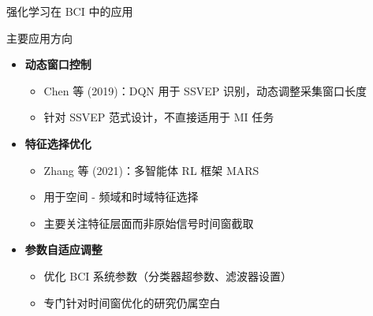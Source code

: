 \begin{frame}{强化学习在 BCI 中的应用}
    \begin{block}{\normalsize 主要应用方向}
        \begin{itemize}
            \item[\textcolor{primaryblue}{\textbullet}] \textbf{动态窗口控制}
            \begin{itemize}
                \item Chen 等 (2019)：DQN 用于 SSVEP 识别，动态调整采集窗口长度
                \item 针对 SSVEP 范式设计，不直接适用于 MI 任务
            \end{itemize}

            \vspace{0.5em}
            \item[\textcolor{primaryblue}{\textbullet}] \textbf{特征选择优化}
            \begin{itemize}
                \item Zhang 等 (2021)：多智能体 RL 框架 MARS
                \item 用于空间 - 频域和时域特征选择
                \item 主要关注特征层面而非原始信号时间窗截取
            \end{itemize}

            \vspace{0.5em}
            \item[\textcolor{primaryblue}{\textbullet}] \textbf{参数自适应调整}
            \begin{itemize}
                \item 优化 BCI 系统参数（分类器超参数、滤波器设置）
                \item 专门针对时间窗优化的研究仍属空白
            \end{itemize}
        \end{itemize}
    \end{block}
\end{frame}

